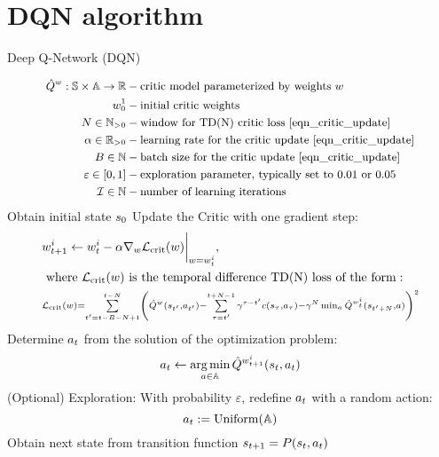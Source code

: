 \documentclass[12pt,twoside]{../../mitthesis}
\begin{document}
\section*{DQN algorithm}
\begin{algorithm}
    \caption{Deep Q-Network (DQN)}
    \label{alg:my-alg}
    \begin{algorithmic}[1]
    \begin{equation*}
        \small
        \begin{aligned}
            \hat{Q}^w : \mathbb S \times \mathbb A \to {\mathbb{R}} &- \text{critic model parameterized by weights $w$} \\
            w_0^1 & - \text{initial critic weights} \\
            N \in {\mathbb{N}}_{>0} & - \text{window for TD(N) critic loss \eqref{eqn_critic_update}} \\
            \alpha \in {\mathbb{R}}_{>0}& - \text{learning rate for the critic update \eqref{eqn_critic_update}} \\
            B \in {\mathbb{N}} & - \text{batch size for the critic update \eqref{eqn_critic_update}} \\
            \varepsilon \in [0, 1] & - \text{exploration parameter, typically set to 0.01 or 0.05} \\
            \mathcal I \in {\mathbb{N}} & - \text{number of learning iterations}
        \end{aligned}
    \end{equation*}
        \STATE Obtain initial state $s_0$
            \STATE Update the Critic with one gradient step:
            \begin{equation}
                \label{eqn_critic_update}
                \begin{aligned}
                &w_{t+1}^i \gets w^i_{t} - \alpha \nabla_w\mathcal L_{{\text{crit}}}(w)\bigg\rvert_{w = w^i_{t}}, \\
                &\text{ where } \mathcal L_{{\text{crit}}}(w) \text{ is the temporal difference TD(N) loss of the form}: \\
                &\scriptstyle {\mathcal L_{{\text{crit}}}(w) = \sum\limits_{t'=t-B-N+1}^{t - N}\left(\hat Q^w(s_{t'}, a_{t'}) - \sum\limits_{\tau=t'}^{t + N - 1} \gamma^{\tau-t'}c(s_{\tau}, a_{\tau}) - \gamma^{N}\min_{a}\hat Q^{w^i_{t}}(s_{t' + N}, a)\right)^2}
                \end{aligned}
            \end{equation}
            \STATE Determine $a_t$ from the solution of the optimization problem:
            $$
                a_t \gets \operatorname*{\text{arg\,min}}_{a \in \mathbb A} \hat Q^{w_{t+1}^i}(s_{t}, a_{t})
            $$
            \STATE (Optional) Exploration: With probability $\varepsilon$, redefine $a_t$ with a random action:
            $$
                a_t := \operatorname{Uniform}(\mathbb A)
            $$
            \STATE Obtain next state from transition function $s_{t+1} = P(s_t, a_t)$
        \ENDFOR
    \ENDFOR
    \end{algorithmic}
\end{algorithm}
\end{document}
